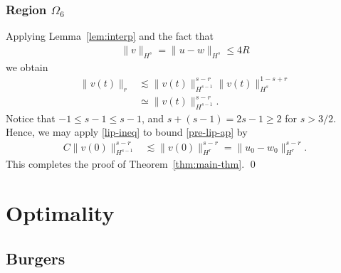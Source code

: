 \documentclass[12pt,reqno]{amsart}
\numberwithin{equation}{section}  %
\numberwithin{figure}{section}
\begin{document}
\subsubsection{Region $\Omega_{6}$} 
\label{ssec:case-2}
%
%
Applying Lemma~\ref{lem:interp} and the fact that 
%
%
\begin{equation*}
\begin{split}
  \|v\|_{H^{s}} = \|u - w \|_{H^{s}} \le 4R
\end{split}
\end{equation*}
%
%
we obtain
%
%
\begin{equation}
  \label{pre-lip-ap}
\begin{split}
  \| v(t) \|_{r} & \lesssim \| v(t) \|_{H^{s-1}}^{s-r} \|v(t) \|_{H^{s}}^{1-s+r}
  \\
  & \simeq \| v(t) \|_{H^{s-1}}^{s-r}.
\end{split}
\end{equation}
%
%
Notice that $-1 \le s-1 \le s-1$, and $s + (s-1) = 2s-1 \ge 2$ for $s >3/2$.
Hence, we may apply \eqref{lip-ineq} to bound \eqref{pre-lip-ap} by
%
%
\begin{equation*}
\begin{split}
  C \|v(0) \|_{H^{s-1}}^{s-r}
  & \lesssim \|v(0) \|_{H^{r}}^{s-r} 
  = \|u_{0} - w_{0}\|_{H^{r}}^{s-r}.
\end{split}
\end{equation*}
%
%
This completes the proof of Theorem~\ref{thm:main-thm}. \qed
%
%
%
%
%
%
%
%
\section{Optimality} 
\label{sec:optimality}
\subsection{Burgers} 
\label{ssec:burgers-opt}
\end{document}
